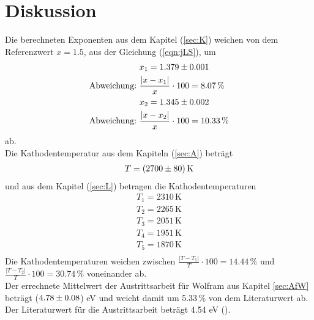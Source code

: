 \section{Diskussion}
\label{sec:Diskussion}

Die berechneten Exponenten aus dem Kapitel (\ref{sec:K}) weichen von dem Referenzwert $x = 1.5$, aus der Gleichung (\ref{eqn:jLS}), um
\begin{align*}
  & x_1 = \num{1.379 +- 0.001} \\
  \text{Abweichung:}\ & \frac{\vert x - x_1 \vert }{x} \cdot 100 = 8.07\, \% \\
  & x_2 = \num{1.345 +- 0.002} \\
  \text{Abweichung:}\ & \frac{\vert x - x_2 \vert}{x} \cdot 100 = 10.33\, \%
\end{align*}
ab. \\
Die Kathodentemperatur aus dem Kapiteln (\ref{sec:A}) beträgt
\begin{align*}
  T = (\num{2700 +- 80}) \, \text{K}
\end{align*}
und aus dem Kapitel (\ref{sec:L}) betragen die Kathodentemperaturen
\begin{align*}
  T_1 = 2310\, \text{K} \\
  T_2 = 2265\, \text{K} \\
  T_3 = 2051\, \text{K} \\
  T_4 = 1951\, \text{K} \\
  T_5 = 1870\, \text{K} \\
\end{align*}
Die Kathodentemperaturen weichen zwischen $\frac{\vert T - T_1 \vert}{T} \cdot 100 = 14.44\,\%$ und $\frac{\vert T - T_2 \vert}{T} \cdot 100 = 30.74\,\%$ voneinander ab.\\
Der errechnete Mittelwert der Austrittsarbeit für Wolfram aus Kapitel \eqref{sec:AfW} beträgt ($\num{4.78 +- 0.08}$) eV und weicht damit um 5.33\,\% von dem Literaturwert ab. Der Literaturwert für die Austrittsarbeit beträgt 4.54 eV (\cite{Wolfram}).
